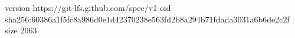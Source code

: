 version https://git-lfs.github.com/spec/v1
oid sha256:60386a1f5fc8a986d0e1d42370238e563fd2b8a294b71fdada3031a6b6de2c2f
size 2063
